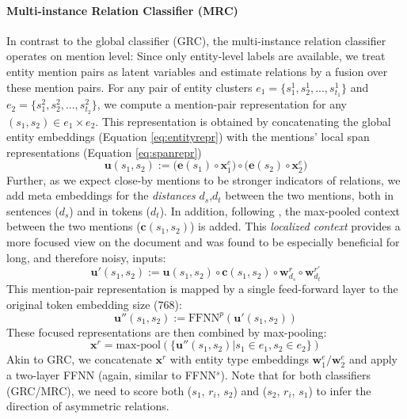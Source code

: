 \documentclass[11pt,a4paper]{article}
\begin{document}
\paragraph{Multi-instance Relation Classifier (MRC)} In contrast to the global classifier (GRC), the multi-instance relation classifier operates on mention level: Since only entity-level labels are available, we treat entity mention pairs as latent variables and estimate relations by a fusion over these mention pairs. For any pair of entity clusters $e_1{=}\{s_1^1, s_2^1, ..., s_{t_1}^1\}$ and $e_2{=}\{s_1^2, s_2^2, ..., s_{t_2}^2\}$, we compute a mention-pair representation for any $(s_1, s_2) {\in} e_1 {\times} e_2$. This representation is obtained by concatenating the global entity embeddings (Equation \eqref{eq:entityrepr}) with the mentions' local span representations (Equation \eqref{eq:spanrepr})
\begin{equation}
\label{eq:mentioninput1}
\mathbf{u}(s_1,s_2) := \Big( \mathbf{e}(s_1) \circ \mathbf{x}^e_1 \Big) \circ \Big(  \mathbf{e}(s_2) \circ \mathbf{x}^e_2 \Big)
\end{equation}
Further, as we expect close-by mentions to be stronger indicators of relations, we add meta embeddings for the {\it distances} $d_s$,$d_t$ between the two mentions, both in sentences ($d_s$) and in tokens ($d_t$). In addition, following \citet{eberts:2020:spert}, the max-pooled context between the two mentions ($\mathbf{c}(s_1, s_2)$) is added. This \emph{localized context} provides a more focused view on the document and was found to be especially beneficial for long, and therefore noisy, inputs:
\begin{equation}
\label{eq:mentioninput2}
\mathbf{u'}(s_1{,}s_2) {:=} \mathbf{u}(s_1{,}s_2) \circ \mathbf{c}(s_1{,} s_2) \circ \mathbf{w}_{d_s}^r \circ 
\mathbf{w}_{d_t}^{r'}
\end{equation}
This mention-pair representation is mapped by a single feed-forward layer to the original token embedding size ($768$):
\begin{equation}
\label{eq:mentionpairrepr}
\mathbf{u''}(s_1, s_2) := \text{FFNN}^p(\mathbf{u'}(s_1, s_2))
\end{equation}
These focused representations are then combined by max-pooling: 
\begin{equation} \label{eq:fusedrepr}
\mathbf{x}^r {=} \text{max-pool}(\{\mathbf{u''}(s_1, s_2) | s_1{\in}e_1{,} s_2{\in} e_2\})
\end{equation}
Akin to GRC, we concatenate $\mathbf{x}^r$ with entity type embeddings $\mathbf{w}_1^e/\mathbf{w}_2^e$ and apply a two-layer FFNN (again, similar to FFNN$^s$).
Note that for both classifiers (GRC/MRC), we need to score both ($s_1$, $r_i$, $s_2$) and ($s_2$, $r_i$, $s_1$) to infer the direction of asymmetric relations.
\end{document}
